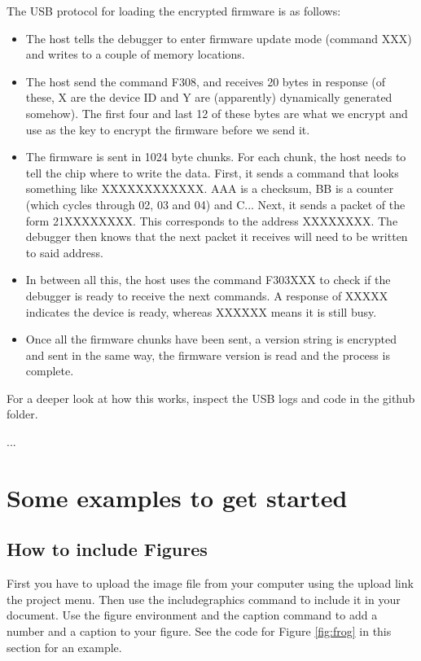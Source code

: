 \documentclass[a4paper]{article}
\begin{document}
The USB protocol for loading the encrypted firmware is as follows:
\begin{itemize}
\item The host tells the debugger to enter firmware update mode (command XXX) and writes to a couple of memory locations.
\item The host send the command F308, and receives 20 bytes in response (of these, X are the device ID and Y are (apparently) dynamically generated somehow). The first four and last 12 of these bytes are what we encrypt and use as the key to encrypt the firmware before we send it.
\item The firmware is sent in 1024 byte chunks. For each chunk, the host needs to tell the chip where to write the data. First, it sends a command that looks something like XXXXXXXXXXXX. AAA is a checksum, BB is a counter (which cycles through 02, 03 and 04) and C... Next, it sends a packet of the form 21XXXXXXXX. This corresponds to the address XXXXXXXX. The debugger then knows that the next packet it receives will need to be written to said address. 
\item In between all this, the host uses the command F303XXX to check if the debugger is ready to receive the next commands. A response of XXXXX indicates the device is ready, whereas XXXXXX means it is still busy.
\item Once all the firmware chunks have been sent, a version string is encrypted and sent in the same way, the firmware version is read and the process is complete.
\end{itemize}

For a deeper look at how this works, inspect the USB logs and code in the github folder.


...



\section{Some examples to get started}

\subsection{How to include Figures}

First you have to upload the image file from your computer using the upload link the project menu. Then use the includegraphics command to include it in your document. Use the figure environment and the caption command to add a number and a caption to your figure. See the code for Figure \ref{fig:frog} in this section for an example.
\end{document}
